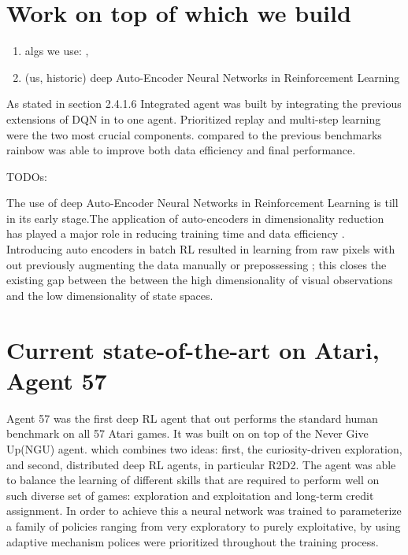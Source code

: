 \section{Work on top of which we build}
\begin{enumerate}
		\item algs we use: \cite{rainbow}, \cite{sac}
		\item (us, historic) deep Auto-Encoder Neural Networks in Reinforcement Learning 
				\cite{firstaeinrl}
\end{enumerate}

As stated in section 2.4.1.6 Integrated agent  
was built by integrating the previous extensions of DQN in to one agent.
Prioritized replay and multi-step learning were the two most crucial components.
compared to the previous benchmarks rainbow was able to improve both  
data efficiency and final performance.

TODOs: \cite{sac}
 
The use of deep Auto-Encoder Neural Networks in Reinforcement Learning is till in its early stage.The application of auto-encoders in dimensionality reduction has played a major role in reducing training time and data efficiency
 \cite{auto-encoder for Efficient Embedded Reinforcement Learning}.
 Introducing auto encoders in batch RL resulted in learning from 
 raw pixels with out previously augmenting the data manually or 
 prepossessing \cite{firstaeinrl}; this closes the  
 existing gap between the  between the high dimensionality of 
 visual observations and the low dimensionality of state spaces.


\section{Current state-of-the-art on Atari, Agent 57}

Agent 57 \cite{agent57}  was the first deep RL agent that out performs 
the standard human benchmark on all 57 Atari games.
It was built on  on top of the Never Give Up(NGU) agent. 
which combines two ideas: first, 
the curiosity-driven exploration, and second, 
distributed deep RL agents, in particular R2D2.
The agent was able to balance the learning of different 
skills that are required to perform well on such diverse set of games: 
exploration and exploitation and long-term credit assignment.
In order to achieve this a neural network was trained to parameterize 
a family of policies ranging from very exploratory to purely exploitative,
by using adaptive  mechanism polices were prioritized throughout the training process.


